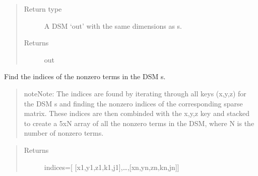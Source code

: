 \documentclass[letterpaper,10pt,english]{sphinxmanual}
\begin{document}
\begin{fulllineitems}
\begin{fulllineitems}
\begin{sphinxVerbatim}[commandchars=\\\{\}]
\PYG{p}{[}\PYG{p}{]}\PYG{p}{[}\PYG{p}{]}\PYG{p}{[}\PYG{p}{]}\PYG{p}{[}\PYG{p}{]}
\PYG{p}{[}\PYG{p}{]}\PYG{p}{[}\PYG{p}{]}\PYG{p}{[}\PYG{p}{]}\PYG{p}{[}\PYG{p}{]}
\end{sphinxVerbatim}
\begin{quote}\begin{description}
\item[{Return type}] \leavevmode
A DSM ‘out’ with the same dimensions as s.

\item[{Returns}] \leavevmode
out

\end{description}\end{quote}

\end{fulllineitems}


\begin{fulllineitems}
\label{\detokenize{index:DictionarySparseMatrix.DS.nonzero}}
Find the indices of the nonzero terms in the DSM s.
\begin{quote}

\begin{sphinxadmonition}{note}{Note:}
The indices are found by iterating through all           keys (x,y,z) for the DSM s and finding the nonzero           indices of the corresponding sparse matrix.           These indices are then combinded           with the x,y,z key and stacked to create a 5xN           array of all the nonzero terms in the DSM,           where N is the number of nonzero           terms.
\end{sphinxadmonition}
\end{quote}
\begin{quote}\begin{description}
\item[{Returns}] \leavevmode
indices={[} {[}x1,y1,z1,k1,j1{]},…,{[}xn,yn,zn,kn,jn{]}{]}


\end{description}
\end{quote}
\end{fulllineitems}
\end{fulllineitems}
\end{document}
